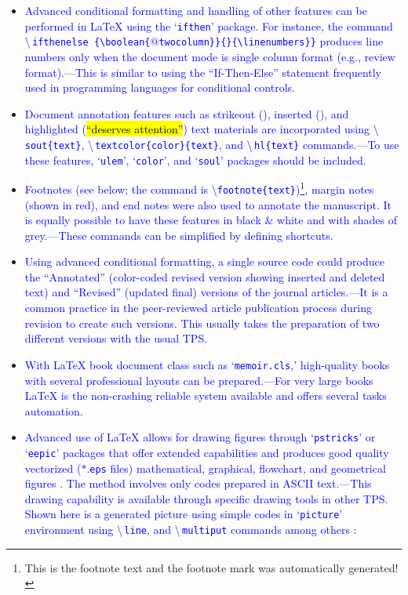 \documentclass[phd]{ndsu-thesis-2022}
\newcommand\italk[1]{\textcolor{blue}{#1}}  %
\newcommand\cmd[1]{\textbackslash\texttt{#1}}  %
\newcommand\lx{\LaTeX\xspace}
\newcommand\vb[1]{\textcolor{blue}{\texttt{#1}}}%
\newcommand\vbc[1]{\textcolor{blue}{\textbackslash\,\texttt{#1}}}%
\begin{document}
\begin{itemize}[leftmargin=*, itemsep=0pt, parsep=3pt]
\item \italk{Advanced conditional formatting and handling of other features can be performed in \lx using the `\vb{ifthen}' package. For instance, the command} \vbc{ifthenelse
\{\textbackslash boolean\{$@$twocolumn\}\}\{\}\{\textbackslash linenumbers\}\}} \italk{produces line numbers only when the document mode is single column format (e.g., review format).---This is similar to using the ``If-Then-Else'' statement frequently used in programming languages for conditional controls.}   

\item \italk{Document annotation features such as strikeout (\dt{``deleted text''}), inserted (\nt{``newly added''}), and highlighted (\hl{``deserves attention''}) text materials are incorporated using \vbc{sout\{text\}}, \vbc{textcolor\{color\}\{text\}}, and \vbc{hl\{text\}} commands.---To use these features, `\vb{ulem}', `\vb{color}', and `\vb{soul}' packages should be included.} 

\item \italk{Footnotes (see below; the command is \cmd{footnote\{text\}})\footnote{This is the footnote text and the footnote mark was automatically generated!}, margin notes {\marginpar{\scriptsize\textcolor{red}{This is margin note shown in color.}}} (shown in red), and end notes were also used to annotate the manuscript. It is equally possible to have these features in black \& white and with shades of grey.---These commands can be simplified by defining shortcuts.} 

\item \italk{Using advanced conditional formatting, a single source code could produce the ``Annotated'' (color-coded revised version showing inserted and deleted text) and ``Revised'' (updated final) versions of the journal articles.---It is a common practice in the peer-reviewed article publication process during revision to create such versions. This usually takes the preparation of two different versions with the usual TPS.}  

\item \italk{With \lx book document class such as `\vb{memoir.cls},' high-quality books with several professional layouts can be prepared.---For very large books \lx is the non-crashing reliable system available and offers several tasks automation.}   

\item \italk{Advanced use of \lx allows for drawing figures through `\vb{pstricks}' or `\vb{eepic}' packages that offer extended capabilities and produces good quality vectorized ($\ast$.\vb{eps} files) mathematical, graphical, flowchart, and geometrical figures \citep{Goossens2008g}. The method involves only codes prepared in ASCII text.---This drawing capability is available through specific drawing tools in other TPS. Shown here is a generated picture using simple codes in `\vb{picture}' environment using \vbc{line}, and \vbc{multiput} commands among others \citep{Kern2007a, Kern2007, Mittelbach2004}:}   


\end{itemize}
\end{document}
